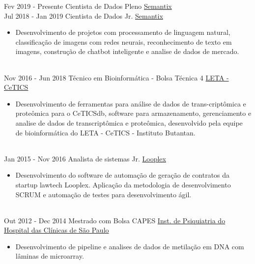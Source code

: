 \documentclass[letterpaper]{twentysecondcv} %
\begin{document}
\begin{twenty} %
	\twentyitem
		{Fev 2019 - }
		{Presente}
		{Cientista de Dados Pleno}
		{\href{http://www.semantix.com.br/}{Semantix}}
        {}
        {}
        \\
	\twentyitem
    	{Jul 2018 - }
		{Jan 2019}
        {Cientista de Dados Jr.}
        {\href{http://www.semantix.com.br/}{Semantix}}
        {}
        {\begin{itemize}
        \item Desenvolvimento de projetos com processamento de linguagem natural, classificação de imagens com redes neurais, reconhecimento de texto em imagens, construção de chatbot inteligente e analise de dados de mercado.
        \end{itemize}}
        \\
	\twentyitem
    	{Nov 2016 - }
		{Jun 2018}
        {Técnico em Bioinformática - Bolsa Técnica 4}
        {\href{http://cetics.butantan.gov.br/}{LETA - CeTICS}}
        {}
        {\begin{itemize}
        \item Desenvolvimento de ferramentas para análise de dados de trans-criptômica e proteômica para o CeTICSdb, software para armazenamento, gerenciamento e analise de dados de transcriptômica e proteômica, desenvolvido pela equipe de bioinformática do LETA - CeTICS - Instituto Butantan.
        \end{itemize}}
        \\
	\twentyitem
    	{Jan 2015 - }
		{Nov 2016}
        {Analista de sistemas Jr.}
        {\href{www.looplex.com.br/}{Looplex}}
        {}
        {
        {\begin{itemize}
        \item Desenvolvimento do software de automação de geração de contratos da startup lawtech Looplex. Aplicação da metodologia de desenvolvimento SCRUM e automação de testes para desenvolvimento ágil.
    \end{itemize}}
        }
    \\   
    \twentyitem
   		{Out 2012 - }
		{Dec 2014}
        {Mestrado com Bolsa CAPES }
        {\href{www.ipqhc.org.br}{ Inst. de Psiquiatria do Hospital das Clínicas de São Paulo}}
        {}
        {
        {\begin{itemize}
        \item Desenvolvimento de pipeline e analises de dados de metilação em DNA com lâminas de microarray.
    \end{itemize}}
        }       
\end{twenty}
\end{document}
